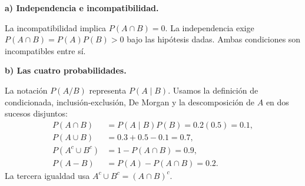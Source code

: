 \textbf{a) Independencia e incompatibilidad.}\par\nopagebreak[4]
La incompatibilidad implica $P(A\cap B)=0$. La independencia exige $P(A\cap B)=P(A)P(B)>0$ bajo las hipótesis dadas. Ambas condiciones son incompatibles entre sí.

\textbf{b) Las cuatro probabilidades.}\par\nopagebreak[4]
La notación $P(A/B)$ representa $P(A\mid B)$. Usamos la definición de condicionada, inclusión-exclusión, De Morgan y la descomposición de $A$ en dos sucesos disjuntos:
\[
\begin{aligned}
P(A\cap B)&=P(A\mid B)P(B)=0.2(0.5)=\boxed{0.1},\\
P(A\cup B)&=0.3+0.5-0.1=\boxed{0.7},\\
P(A^c\cup B^c)&=1-P(A\cap B)=\boxed{0.9},\\
P(A-B)&=P(A)-P(A\cap B)=\boxed{0.2}.
\end{aligned}
\]
La tercera igualdad usa $A^c\cup B^c=(A\cap B)^c$.
